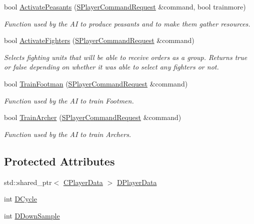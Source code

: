 \begin{DoxyCompactItemize}
bool \hyperlink{classCAIPlayer_a3fab1c955fd68bb53fa80bb1872d2819}{Activate\+Peasants} (\hyperlink{structSPlayerCommandRequest}{S\+Player\+Command\+Request} \&command, bool trainmore)
\begin{DoxyCompactList}\small\item\em Function used by the AI to produce peasants and to make them gather resources. \end{DoxyCompactList}\item 
bool \hyperlink{classCAIPlayer_a4216d7e76315234a4fe22fb3a0a89c1d}{Activate\+Fighters} (\hyperlink{structSPlayerCommandRequest}{S\+Player\+Command\+Request} \&command)
\begin{DoxyCompactList}\small\item\em Selects fighting units that will be able to receive orders as a group. Returns true or false depending on whether it was able to select any fighters or not. \end{DoxyCompactList}\item 
bool \hyperlink{classCAIPlayer_aa3f9c1d0d449a45a24e065d2086527b0}{Train\+Footman} (\hyperlink{structSPlayerCommandRequest}{S\+Player\+Command\+Request} \&command)
\begin{DoxyCompactList}\small\item\em Function used by the AI to train Footmen. \end{DoxyCompactList}\item 
bool \hyperlink{classCAIPlayer_af2edf1e3c54d6af693f768f86d484fd6}{Train\+Archer} (\hyperlink{structSPlayerCommandRequest}{S\+Player\+Command\+Request} \&command)
\begin{DoxyCompactList}\small\item\em Function used by the AI to train Archers. \end{DoxyCompactList}\end{DoxyCompactItemize}
\subsection*{Protected Attributes}
\begin{DoxyCompactItemize}
\item 
std\+::shared\+\_\+ptr$<$ \hyperlink{classCPlayerData}{C\+Player\+Data} $>$ \hyperlink{classCAIPlayer_a83b5113c8f7e80df54940b647c5ee2e6}{D\+Player\+Data}
\item 
int \hyperlink{classCAIPlayer_adf12a7afe7ea86410b18eff47fa95253}{D\+Cycle}
\item 
int \hyperlink{classCAIPlayer_a091aed92cb9ad1a789900a6394d2f352}{D\+Down\+Sample}
\end{DoxyCompactItemize}


